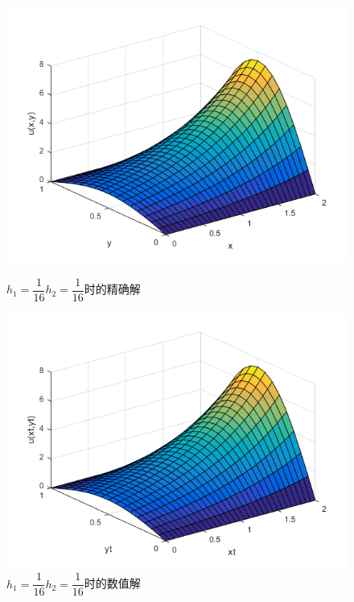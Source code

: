 \documentclass[withoutpreface,bwprint]{cumcmthesis} %
\begin{document}
\begin{figure}[htbp]
	\begin{minipage}[htbp]{0.5\linewidth}
		\centering
		\includegraphics[width=1\linewidth]{figures/f7}
		\caption{$h_1=\dfrac{1}{16}$\quad$h_2=\dfrac{1}{16}$时的精确解}
		\label{fig:f7}
	\end{minipage}
	\begin{minipage}[htbp]{0.5\linewidth}
		\centering
		\includegraphics[width=1\linewidth]{figures/f8}
		\caption{$h_1=\dfrac{1}{16}$\quad$h_2=\dfrac{1}{16}$时的数值解}
		\label{fig:f8}
	\end{minipage}
\end{figure}
\end{document}
